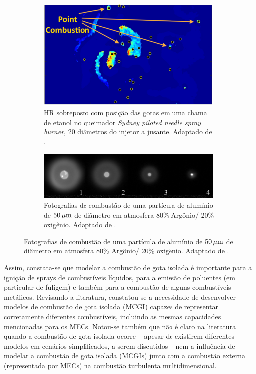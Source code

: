 \begin{figure}[H]
\begin{subfigure}[t]{0.59\textwidth}
        \centering
        \includegraphics[width=0.99\textwidth]{30_images/SinghG2020-10.png}
        \vfill
        \caption{HR sobreposto com posição das gotas em uma chama de etanol no queimador \emph{Sydney piloted needle spray burner}, 20 diâmetros do injetor a jusante. Adaptado de \cite[Fig. 10]{SinghG2020}.}
        \label{fig:SinghG2020-10}
    \end{subfigure}
    \vspace{0.5cm}
    \begin{subfigure}[b]{0.8\textwidth}
        \centering
        \includegraphics[width=0.99\textwidth]{30_images/Braconnier202PhD-5.20.png}
        \caption{Fotografias de combustão de uma partícula de alumínio de $50 \, \mathrm{\mu m}$ de diâmetro em atmosfera 80\% Argônio/ 20\% oxigênio. Adaptado de \cite[Fig. 5.21]{Braconnier2022}.}
        \label{fig:Braconnier202PhD-5.20}
    \end{subfigure}
    \label{fig:sdc-exp}
\end{figure}

Assim, constata-se que modelar a combustão de gota isolada é importante para a ignição de sprays de combustíveis líquidos, para a emissão de poluentes (em particular de fuligem) e também para a combustão de alguns combustíveis metálicos. 
Revisando a literatura, constatou-se a necessidade de desenvolver modelos de combustão de gota isolada (MCGI) capazes de representar corretamente diferentes combustíveis, incluindo as mesmas capacidades mencionadas para os MECs.
Notou-se também que não é claro na literatura quando a combustão de gota isolada ocorre \cite[p. 8]{JennyB2012} -- apesar de existirem diferentes modelos em cenários simplificados, a serem discutidos -- nem a influência de modelar a combustão de gota isolada (MCGIs) junto com a combustão externa (representada por MECs) na combustão turbulenta multidimensional.


